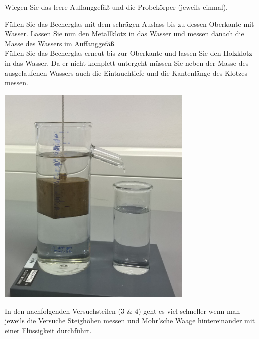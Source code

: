 %
\begin{enumerate} \setcounter{enumi}{1}

 \begin{minipage}{0.5\textwidth}
	\item Wiegen Sie das leere Auffanggefäß und die Probekörper (jeweils einmal). 
	\item Füllen Sie das Becherglas mit dem schrägen Auslass bis zu dessen Oberkante mit Wasser. Lassen Sie nun den Metallklotz in das Wasser und messen danach die Masse des Wassers im Auffanggefäß. \\
	Füllen Sie das Becherglas erneut bis zur Oberkante und lassen Sie den Holzklotz in das Wasser. Da er nicht komplett untergeht müssen Sie neben der Masse des ausgelaufenen Wassers auch die Eintauchtiefe und die Kantenlänge des Klotzes messen.
 \end{minipage}
 \begin{minipage}{0.5\textwidth}
	\centering
	\includegraphics[width=0.7\textwidth]{Abbildungen/V7-2.jpg}
 \end{minipage}
\end{enumerate}
%
\begin{hint}
	In den nachfolgenden Versuchsteilen (3 \& 4) geht es viel schneller wenn man jeweils die Versuche Steighöhen messen und Mohr'sche Waage hintereinander mit einer Flüssigkeit durchführt.
\end{hint}

